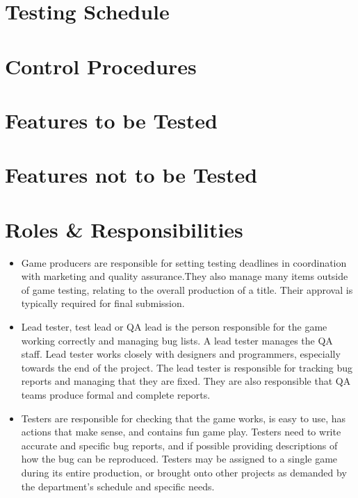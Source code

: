 \documentclass{article}
\begin{document}
\section{Testing Schedule}

\newpage

\section{Control Procedures}

\newpage

\section{Features to be Tested}

\newpage

\section{Features not to be Tested}

\newpage

\section{Roles & Responsibilities}
\begin{itemize}
    \item Game producers are responsible for setting testing deadlines in coordination with marketing and quality assurance.They also manage many items outside of game testing, relating to the overall production of a title. Their approval is typically required for final submission.
    \item Lead tester, test lead or QA lead is the person responsible for the game working correctly and managing bug lists. A lead tester manages the QA staff. Lead tester works closely with designers and programmers, especially towards the end of the project. The lead tester is responsible for tracking bug reports and managing that they are fixed. They are also responsible that QA teams produce formal and complete reports.
    \item Testers are responsible for checking that the game works, is easy to use, has actions that make sense, and contains fun game play. Testers need to write accurate and specific bug reports, and if possible providing descriptions of how the bug can be reproduced. Testers may be assigned to a single game during its entire production, or brought onto other projects as demanded by the department's schedule and specific needs.
\end{itemize}
\newpage
\end{document}
